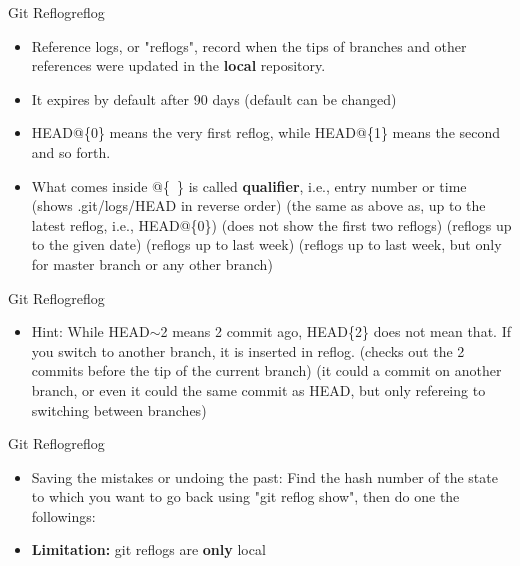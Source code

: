 \begin{frame}{Git Reflog}{reflog}
\begin{itemize}
    \item  Reference logs, or "reflogs", record when the tips of branches and other references were updated in the 
      \textbf{local} repository. 
    \item It expires by default after 90 days (default can be changed) 
    \item HEAD@\{0\} means the very first reflog, while HEAD@\{1\} means the second and so forth.
    \item What comes inside @\{~\} is called \textbf{qualifier}, i.e., entry number or time
     (shows .git/logs/HEAD in reverse order)
     (the same as above as, up to the latest reflog, i.e., HEAD@\{0\})
     (does not show the first two reflogs)
     (reflogs up to the given date)
     (reflogs up to last week)
     (reflogs up to last week, but only for master branch
    or any other branch)
\end{itemize}
\end{frame}

\begin{frame}{Git Reflog}{reflog}
\begin{itemize}
  \item {\color{red} Hint:} While HEAD$\sim$2 means 2 commit ago, HEAD\{2\} does not mean that. If you switch
    to another branch, it is inserted in reflog.
    (checks out the 2 commits before the tip of the current branch)
     (it could a commit on another branch, or even it could the same commit
   as HEAD, but only refereing to switching between branches)
\end{itemize}
\end{frame}

\begin{frame}{Git Reflog}{reflog}
\begin{itemize}
  \item {\color{red} Saving the mistakes or undoing the past:} Find the hash number of the
    state to which you want to go back using "git reflog show", then do
    one the followings:
  \item {\color{red} \Large \textbf{Limitation:}} git reflogs are \textbf{only} local
\end{itemize}
\end{frame}
